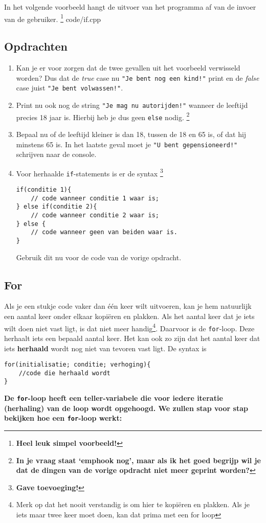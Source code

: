 \documentclass[12pt,a4paper]{article}
\newcommand{\code}{}
\newcommand{\icode}{\lstinline}
\begin{document}
In het volgende voorbeeld hangt de uitvoer van het programma af van de invoer van de gebruiker. \footnote{\textbf{Heel leuk simpel voorbeeld!}}
\code{code/if.cpp}

\subsection{Opdrachten}
\begin{enumerate}
		\item
		Kan je er voor zorgen dat de twee gevallen uit het voorbeeld verwisseld worden? Dus dat de \emph{true} case nu \icode{"Je bent nog een kind!"} print en de \emph{false} case juist \icode{"Je bent volwassen!"}.
		\item
			Print nu ook nog de string \icode{"Je mag nu autorijden!"} wanneer de leeftijd precies 18 jaar is. Hierbij heb je dus geen \icode{else} nodig. \footnote{\textbf{In je vraag staat `emph{ook} nog', maar als ik het goed begrijp wil je dat de dingen van de vorige opdracht niet meer geprint worden?}}
		\item
			Bepaal nu of de leeftijd kleiner is dan 18, tussen de 18 en 65 is, of dat hij minstens 65 is. In het laatste geval moet je \icode{"U bent gepensioneerd!"} schrijven naar de console.
		\item
			Voor herhaalde \icode{if}-statements is er de syntax \footnote{\textbf{Gave toevoeging!}}
\begin{lstlisting}
if(conditie 1){
	// code wanneer conditie 1 waar is;
} else if(conditie 2){
	// code wanneer conditie 2 waar is;
} else {
	// code wanneer geen van beiden waar is.
}
\end{lstlisting}
Gebruik dit nu voor de code van de vorige opdracht.
\end{enumerate}


\subsection{For}
Als je een stukje code vaker dan \'e\'en keer wilt uitvoeren, kan je hem natuurlijk een aantal keer onder elkaar kopi\"eren en plakken. Als het aantal keer dat je iets wilt doen niet vast ligt, is dat niet meer handig\footnote{Merk op dat het nooit verstandig is om hier te kopi\"eren en plakken. Als je iets maar twee keer moet doen, kan dat prima met een for loop}. Daarvoor is de \icode{for}-loop.
Deze herhaalt iets een bepaald aantal keer. Het kan ook zo zijn dat het aantal keer dat iets \textbf{herhaald} wordt nog niet van tevoren vast ligt. De syntax is 
\begin{lstlisting}
for(initialisatie; conditie; verhoging){
	//code die herhaald wordt
}
\end{lstlisting}
\textbf{De \icode{for}-loop heeft een teller-variabele die voor iedere iteratie (herhaling) van de loop wordt opgehoogd. We zullen stap voor stap bekijken hoe een \icode{for}-loop werkt:}
\end{document}
